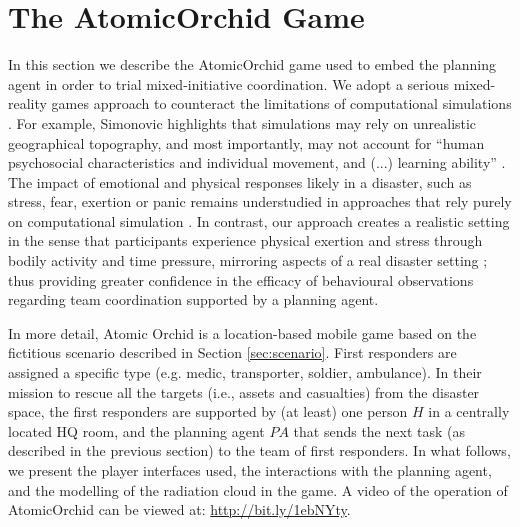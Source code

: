 \section{The A\lowercase{tomic}O\lowercase{rchid} Game}\label{sec:atomicorchid}
\noindent In this section we describe the AtomicOrchid game used to embed the planning agent in order to trial mixed-initiative coordination.
We adopt a serious mixed-reality games approach to counteract the limitations of computational simulations \cite{Fischer:etal:2012}. For example, Simonovic highlights that simulations may rely on unrealistic geographical topography, and most importantly, may not account for ``human psychosocial characteristics and individual movement, and (...) learning ability'' \cite{simonovic:2009}. The impact of emotional and physical responses likely in a disaster, such as stress, fear, exertion or panic remains understudied in approaches that rely purely on computational simulation \cite{drury:etal:2009}. In contrast, our approach creates a realistic setting in the sense that participants experience physical exertion and stress through bodily activity and time pressure, mirroring aspects of a real disaster setting \cite{paho:2001}; thus providing greater confidence in the efficacy of behavioural observations regarding team coordination supported by a planning agent.

In more detail, Atomic Orchid is a location-based mobile game based on the fictitious scenario described in Section \ref{sec:scenario}. First responders are assigned a specific type (e.g. medic, transporter, soldier, ambulance). In their mission to rescue all the targets (i.e., assets and casualties) from the disaster space, the first responders are supported by (at least) one person $H$ in a centrally located HQ room, and the planning agent $PA$ that sends the next task (as described in the previous section) to the team of first responders. In what follows, we present the player interfaces used, the interactions with the planning agent, and the modelling of the radiation cloud in the game. A video of the operation of AtomicOrchid can be viewed at: \url{http://bit.ly/1ebNYty}.






